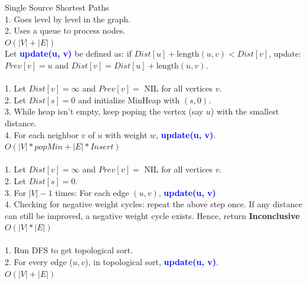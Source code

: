 \documentclass[10pt,a4paper]{article}
\begin{document}
\begin{multicols}{3}
\begin{textbox}{Single Source Shortest Paths}
      \\
    1. Goes level by level in the graph.\\
    2. Uses a queue to process nodes.\\ 
     $O(|V| + |E|)$ \\
    \linebreak
    Let  {\bf \textcolor{blue}{update(u, v)}} be defined as: if $Dist[u] + \text{length}(u, v)< Dist[v]$, update: $Prev[v] = u$ and $Dist[v] = Dist[u] + \text{length}(u, v)$.\\
      \\ 
    1. Let $Dist[v] = \infty$ and $Prev[v] = $ NIL for all vertices $v$.\\
    2. Let $Dist[s] = 0$ and initialize MinHeap with $(s, 0)$.\\
    3. While heap isn't empty, keep poping the vertex (say $u$) with the smallest distance.\\
    4. For each neighbor $v$ of $u$ with weight $w$, {\bf \textcolor{blue}{update(u, v)}}.\\
    \linebreak
     $O(|V|*popMin + |E|*Insert)$ \\
    \linebreak
     \\
    1. Let $Dist[v] = \infty$ and $Prev[v] = $ NIL for all vertices $v$.\\
    2. Let $Dist[s] = 0$.\\
    3. For $|V|-1$ times: For each edge $(u, v)$, {\bf \textcolor{blue}{update(u, v)}}\\
    4. Checking for negative weight cycles: repeat the above step once. If any distance can still be improved, a negative weight cycle exists. Hence, return {\bf Inconclusive}\\
    \linebreak
     $O(|V|*|E|)$ \\
    \linebreak
      \\
    1. Run DFS to get topological sort.\\
    2. For every edge ($u, v$), in topological sort, {\bf \textcolor{blue}{update(u, v)}}.\\
     $O(|V| + |E|)$ \\
\end{textbox}


\end{multicols}
\end{document}
